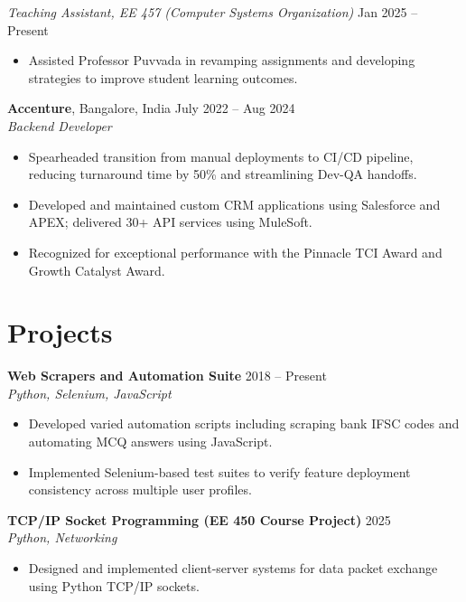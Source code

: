 \documentclass[letterpaper,10pt]{article}
\begin{document}
\vspace{-2pt}

\textit{Teaching Assistant, EE 457 (Computer Systems Organization)} \hfill Jan 2025 -- Present
\begin{itemize} \itemsep -2pt
    \item Assisted Professor Puvvada in revamping assignments and developing strategies to improve student learning outcomes.
\end{itemize}

\textbf{Accenture}, Bangalore, India \hfill July 2022 -- Aug 2024 \\
\textit{Backend Developer}
\begin{itemize} \itemsep -2pt
    \item Spearheaded transition from manual deployments to CI/CD pipeline, reducing turnaround time by 50\% and streamlining Dev-QA handoffs.
    \item Developed and maintained custom CRM applications using Salesforce and APEX; delivered 30+ API services using MuleSoft.
    \item Recognized for exceptional performance with the Pinnacle TCI Award and Growth Catalyst Award.
\end{itemize}

\section*{Projects}
\textbf{Web Scrapers and Automation Suite} \hfill 2018 -- Present \\
\textit{Python, Selenium, JavaScript}
\begin{itemize} \itemsep -2pt
    \item Developed varied automation scripts including scraping bank IFSC codes and automating MCQ answers using JavaScript.
    \item Implemented Selenium-based test suites to verify feature deployment consistency across multiple user profiles.
\end{itemize}

\textbf{TCP/IP Socket Programming (EE 450 Course Project)} \hfill 2025 \\
\textit{Python, Networking}
\begin{itemize} \itemsep -2pt
    \item Designed and implemented client-server systems for data packet exchange using Python TCP/IP sockets.
\end{itemize}
\end{document}

